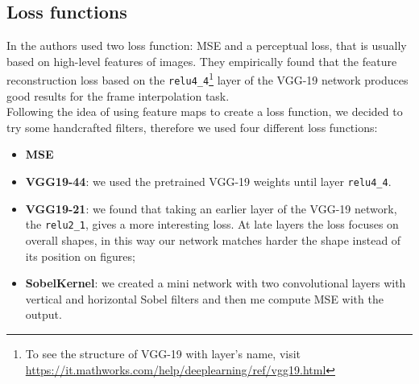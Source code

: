 \documentclass[11pt, a4paper]{article}
\begin{document}
	\subsection{Loss functions}
	In \cite{mainpaper} the authors used two loss function: MSE and a perceptual loss, that is usually based on high-level features of	images. They empirically found that the feature reconstruction loss based on the \texttt{relu4\_4}\footnote{\label{vgg-structure}To see the structure of VGG-19 with layer's name, visit \url{https://it.mathworks.com/help/deeplearning/ref/vgg19.html}} layer of the VGG-19 network produces good results for the frame interpolation task.\\
	Following the idea of using feature maps to create a loss function, we decided to try some handcrafted filters, therefore we used four different loss functions:
	\begin{itemize}
		\item \textbf{MSE}
		\item \textbf{VGG19-44}: we used the pretrained VGG-19 weights until layer \texttt{relu4\_4}. %
		\item \textbf{VGG19-21}: we found that taking an earlier layer of the VGG-19 network, the \texttt{relu2\_1}, gives a more interesting loss. At late layers the loss focuses on overall shapes, in this way our network matches harder the shape instead of its position on figures;
		\item \textbf{SobelKernel}: we created a mini network with two convolutional layers with vertical and horizontal Sobel filters and then me compute MSE with the output.
	\end{itemize}
\end{document}
